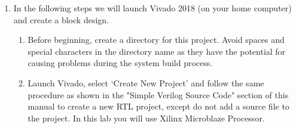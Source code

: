 \documentclass[11pt,twoside,titlepage]{article}
\begin{document}
	\begin{enumerate}
		
		\item In the following steps we will launch Vivado 2018 (on your home computer) and  create a block design. \\
		\begin{enumerate}
			\item Before beginning, create a directory for this project. Avoid spaces and special characters in the directory name as they have the potential for causing problems during the system build process.
			
			
			\item Launch Vivado, select `Create New Project' and follow the same procedure as shown in the "Simple Verilog Source Code" section of this manual to create a new RTL project, except do not add a source file to the project. In this lab you will use Xilinx Microblaze Processor.
			

\end{enumerate}
\end{enumerate}
\end{document}
